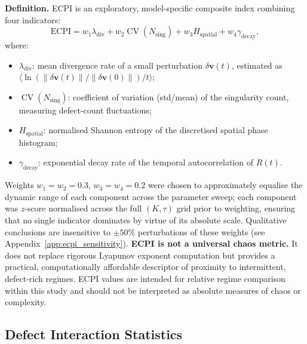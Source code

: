 \documentclass[11pt,a4paper]{article}
\begin{document}
\textbf{Definition.} ECPI is an exploratory, model-specific
composite index combining four indicators:
\begin{equation}
    \text{ECPI} = w_1 \lambda_{\text{div}}
                + w_2 \operatorname{CV}(N_{\text{sing}})
                + w_3 H_{\text{spatial}}
                + w_4 \gamma_{\text{decay}},
    \label{eq:ecpi}
\end{equation}
where:
\begin{itemize}
    \item $\lambda_{\text{div}}$: mean divergence rate of a
          small perturbation $\delta\mathbf{v}(t)$, estimated
          as $\langle \ln(\|\delta\mathbf{v}(t)\|/
          \|\delta\mathbf{v}(0)\|) / t \rangle$;
    \item $\operatorname{CV}(N_{\text{sing}})$: coefficient of
          variation (std/mean) of the singularity count, measuring
          defect-count fluctuations;
    \item $H_{\text{spatial}}$: normalised Shannon entropy of
          the discretised spatial phase histogram;
    \item $\gamma_{\text{decay}}$: exponential decay rate of
          the temporal autocorrelation of $R(t)$.
\end{itemize}
Weights $w_1=w_2=0.3$, $w_3=w_4=0.2$ were chosen to
approximately equalise the dynamic range of each component
across the parameter sweep; each component was $z$-score
normalised across the full $(K,\tau)$ grid prior to weighting,
ensuring that no single indicator dominates by virtue of its
absolute scale.
Qualitative conclusions are
insensitive to $\pm 50\%$ perturbations of these weights
(see Appendix~\ref{app:ecpi_sensitivity}).
\textbf{ECPI is not a universal chaos metric.} It does not
replace rigorous Lyapunov exponent computation but provides a
practical, computationally affordable descriptor of proximity
to intermittent, defect-rich regimes. ECPI values are intended
for relative regime comparison within this study and should not
be interpreted as absolute measures of chaos or complexity.

\subsection{Defect Interaction Statistics}
\end{document}
